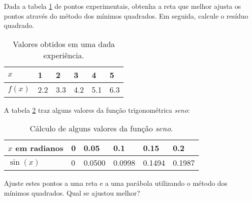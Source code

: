 %
%
%
%
%
%
%
%
%
%
%
%
%
%
%
%
%
%
%
%
%
%
%

\begin{ex}
Dada a tabela \ref{experimentos} de pontos experimentais, obtenha a reta que melhor ajusta os pontos através do método dos mínimos quadrados. Em seguida, calcule o resíduo quadrado.
\begin{table}[hbt]
\centering
\caption{Valores obtidos em uma dada experiência.}
\label{experimentos}
\begin{tabular}{@{}llllll@{}}
\toprule
$x$	& 1	& 2   & 3		& 4   & 5          \\ \midrule
$f(x)$		& 2.2	& 3.3 & 4.2	& 5.1 & 6.3   \\ \bottomrule
\end{tabular}
\end{table}

\end{ex}

\begin{ex}
A tabela \ref{sen} traz alguns valores da função trigonométrica \emph{seno}:
\begin{table}[hbt]
\centering
\caption{Cálculo de alguns valores da função \emph{seno}.}
\label{sen}
\begin{tabular}{@{}llllll@{}}
\toprule
$x$ em radianos	& 0	& 0.05   & 0.1		& 0.15   & 0.2          \\ \midrule
$\sin(x)$		& 0	& 0.0500 & 0.0998	& 0.1494 & 0.1987   \\ \bottomrule
\end{tabular}
\end{table}


Ajuste estes pontos a uma reta e a uma parábola utilizando o método dos mínimos quadrados. Qual se ajustou melhor?
\end{ex}

